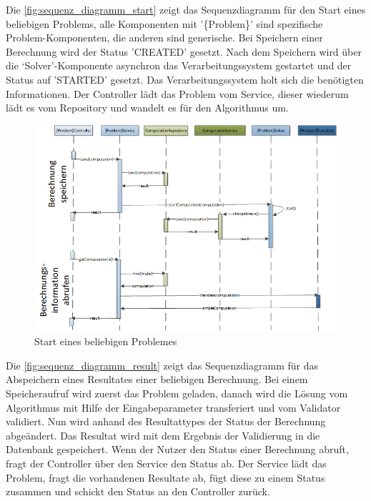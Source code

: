 \FloatBarrier
\newpage

Die \autoref{fig:sequenz_diagramm_start} zeigt das Sequenzdiagramm für den Start eines beliebigen Problems, alle Komponenten mit '\{Problem\}' sind spezifische Problem-Komponenten, 
die anderen sind generische. Bei Speichern einer Berechnung wird der Status 'CREATED' gesetzt. Nach dem Speichern wird über die `Solver'-Komponente asynchron das Verarbeitungssystem 
gestartet und der Status auf 'STARTED' gesetzt. Das Verarbeitungssystem holt sich die benötigten Informationen. Der Controller lädt das Problem vom Service, dieser wiederum lädt es vom 
Repository und wandelt es für den Algorithmus um.

\begin{figure}[h]
\centering
\includegraphics[scale=0.74]{images/visio/sequenz_diagramm_start.png}
\caption[Start eines beliebigen Problemes]{Start eines beliebigen Problemes \selfmade{}}
\label{fig:sequenz_diagramm_start}
\end{figure}

\newpage

Die \autoref{fig:sequenz_diagramm_result} zeigt das Sequenzdiagramm für das Abspeichern eines Resultates einer beliebigen Berechnung. Bei einem Speicheraufruf wird zuerst das Problem 
geladen, danach wird die Lösung vom Algorithmus mit Hilfe der Eingabeparameter transferiert und vom Validator validiert. Nun wird anhand des Resultattypes der Status der Berechnung 
abgeändert. Das Resultat wird mit dem Ergebnis der Validierung in die Datenbank gespeichert. Wenn der Nutzer den Status einer Berechnung abruft, fragt der Controller über den 
Service den Status ab. Der Service lädt das Problem, fragt die vorhandenen Resultate ab, fügt diese zu einem Status zusammen und schickt den Status an den Controller zurück.

